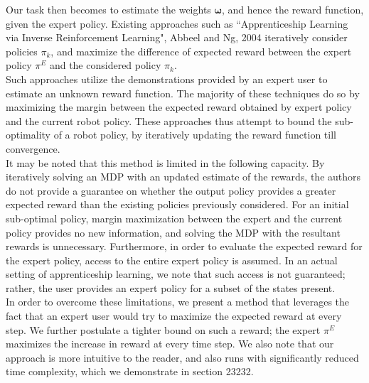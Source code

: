 Our task then becomes to estimate the weights $\bm{\omega}$, and hence the reward function, given the expert policy.  
Existing approaches such as ``Apprenticeship Learning via Inverse Reinforcement Learning", Abbeel and Ng, 2004 iteratively consider policies $\pi_k$, and maximize the difference of expected reward between the expert policy $\pi^E$ and the considered policy $\pi_k$.\\


Such approaches utilize the demonstrations provided by an expert user to estimate an unknown reward function. The majority of these techniques do so by maximizing the margin between the expected reward obtained by expert policy and the current robot policy. These approaches thus attempt to bound the sub-optimality of a robot policy, by iteratively updating the reward function till convergence. \\

It may be noted that this method is limited in the following capacity. 
By iteratively solving an MDP with an updated estimate of the rewards, the authors do not provide a guarantee on whether the output policy provides a greater expected reward than the existing policies previously considered. For an initial sub-optimal policy, margin maximization between the expert and the current policy provides no new information, and solving the MDP with the resultant rewards is unnecessary. Furthermore, in order to evaluate the expected reward for the expert policy, access to the entire expert policy is assumed. In an actual setting of apprenticeship learning, we note that such access is not guaranteed; rather, the user provides an expert policy for a subset of the states present. \\

In order to overcome these limitations, we present a method that leverages the fact that an expert user would try to maximize the expected reward at every step. We further postulate a tighter bound on such a reward; the expert $\pi^E$ maximizes the increase in reward at every time step. We also note that our approach is more intuitive to the reader, and also runs with significantly reduced time complexity, which we demonstrate in section 23232. \\

